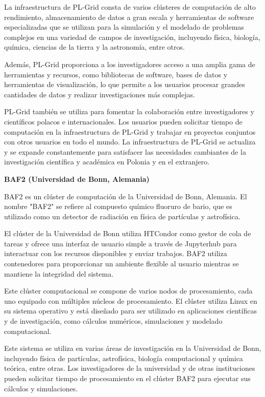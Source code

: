 \begin{spacing}{1.5}
  La infraestructura de PL-Grid consta de varios clústeres de computación de alto rendimiento, almacenamiento de datos a gran escala y herramientas de software especializadas que se utilizan para la simulación y el modelado de problemas complejos en una variedad de campos de investigación, incluyendo física, biología, química, ciencias de la tierra y la astronomía, entre otros.

  Además, PL-Grid proporciona a los investigadores acceso a una amplia gama de herramientas y recursos, como bibliotecas de software, bases de datos y herramientas de visualización, lo que permite a los usuarios procesar grandes cantidades de datos y realizar investigaciones más complejas.

  PL-Grid también se utiliza para fomentar la colaboración entre investigadores y científicos polacos e internacionales. Los usuarios pueden solicitar tiempo de computación en la infraestructura de PL-Grid y trabajar en proyectos conjuntos con otros usuarios en todo el mundo. La infraestructura de PL-Grid se actualiza y se expande constantemente para satisfacer las necesidades cambiantes de la investigación científica y académica en Polonia y en el extranjero.


  \textbf{BAF2 (Universidad de Bonn, Alemania)}

  BAF2 es un clúster de computación de la Universidad de Bonn, Alemania. El nombre "BAF2" se refiere al compuesto químico fluoruro de bario, que es utilizado como un detector de radiación en física de partículas y astrofísica.

  El clúster de la Universidad de Bonn utiliza HTCondor como gestor de cola de tareas y ofrece una interfaz de usuario simple a través de Jupyterhub para interactuar con los recursos disponibles y enviar trabajos. BAF2 utiliza contenedores para proporcionar un ambiente flexible al usuario mientras se mantiene la integridad del sistema.

  Este clúster computacional se compone de varios nodos de procesamiento, cada uno equipado con múltiples núcleos de procesamiento. El clúster utiliza Linux en su sistema operativo y está diseñado para ser utilizado en aplicaciones científicas y de investigación, como cálculos numéricos, simulaciones y modelado computacional.

  Este sistema se utiliza en varias áreas de investigación en la Universidad de Bonn, incluyendo física de partículas, astrofísica, biología computacional y química teórica, entre otras. Los investigadores de la universidad y de otras instituciones pueden solicitar tiempo de procesamiento en el clúster BAF2 para ejecutar sus cálculos y simulaciones.


\end{spacing}
